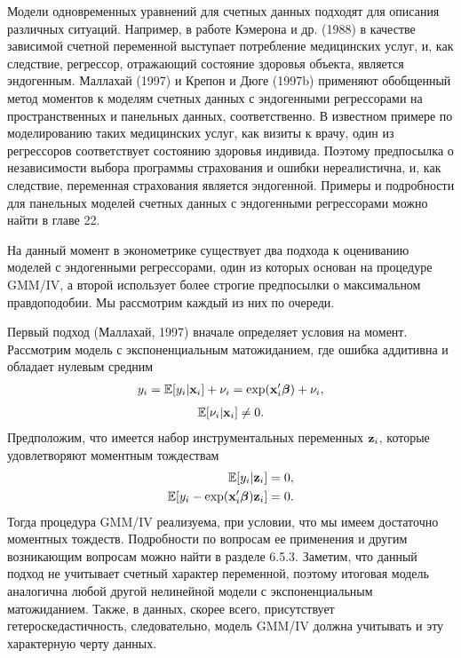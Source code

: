 \noindent
Модели одновременных уравнений для счетных данных подходят для описания различных ситуаций. Например, в работе Кэмерона и др. (1988) в качестве зависимой счетной переменной выступает потребление медицинских услуг, и, как следствие, регрессор, отражающий состояние здоровья объекта, является эндогенным. Маллахай (1997) и Крепон и Дюге (1997b) применяют обобщенный метод моментов к моделям счетных данных с эндогенными регрессорами на пространственных и панельных данных, соответственно. В известном примере по моделированию таких медицинских услуг, как визиты к врачу, один из регрессоров соответствует состоянию здоровья индивида. Поэтому предпосылка о независимости выбора программы страхования и ошибки нереалистична, и, как следствие, переменная страхования является эндогенной. Примеры и подробности для панельных моделей счетных данных с эндогенными регрессорами можно найти в главе 22.

На данный момент в эконометрике существует два подхода к оцениванию моделей с эндогенными регрессорами, один из которых основан на процедуре GMM/IV, а второй использует более строгие предпосылки о максимальном правдоподобии. Мы рассмотрим каждый из них по очереди.

Первый подход (Маллахай, 1997) вначале определяет условия на момент. Рассмотрим модель с экспоненциальным матожиданием, где ошибка аддитивна и обладает нулевым средним
    \begin{align}\label{eq:20.26}
    y_i = \mathbb{E}[y_i|\mathbf{x}_i] + \nu_i = \exp(\mathbf{x}_i'\bm{\beta}) + \nu_i,
    \end{align}
    \begin{align}\label{eq:20.27}
    \mathbb{E}[\nu_i|\mathbf{x}_i] \ne 0.
    \end{align}
Предположим, что имеется набор инструментальных переменных $\mathbf{z}_i$, которые удовлетворяют моментным тождествам
    \begin{align}\label{eq:20.28}
    \mathbb{E}[y_i|\mathbf{z}_i]    &= 0, \\
    \mathbb{E}[y_i - \exp(\mathbf{x}_i'\bm{\beta})\mathbf{z}_i] &= 0. \notag
    \end{align}
Тогда процедура GMM/IV реализуема, при условии, что мы имеем достаточно моментных тождеств. Подробности по вопросам ее применения и другим возникающим вопросам можно найти в разделе 6.5.3. Заметим, что данный подход не учитывает счетный характер переменной, поэтому итоговая модель аналогична любой другой нелинейной модели с экспоненциальным матожиданием. Также, в данных, скорее всего, присутствует гетероскедастичность, следовательно, модель GMM/IV должна учитывать и эту характерную черту данных.

